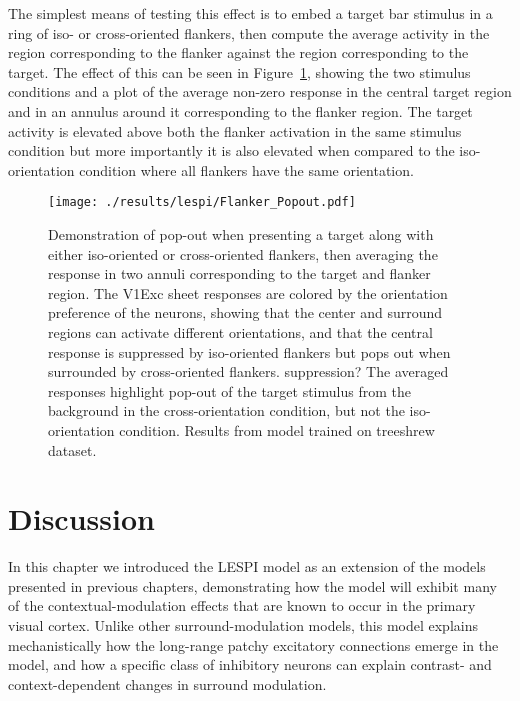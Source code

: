 The simplest means of testing this effect is to embed a target bar
stimulus in a ring of iso- or cross-oriented flankers, then compute
the average activity in the region corresponding to the flanker
against the region corresponding to the target. The
effect of this can be seen in Figure~\ref{Flanker_PopOut}, showing the
two stimulus conditions and a plot of the average non-zero response in
the central target region and in an annulus around it corresponding to
the flanker region. The target activity is elevated above both the
flanker activation in the same stimulus condition but more importantly
it is also elevated when compared to the iso-orientation condition
where all flankers have the same orientation.

\begin{figure}
	\centering
        \texttt{[image: ./results/lespi/Flanker\_Popout.pdf]}
	\caption[Pop-out effect in simple flanker paradigm.]{Demonstration
      of pop-out when presenting a target along with either
      iso-oriented or cross-oriented flankers, then averaging the
      response in two annuli corresponding to the target and flanker
      region. The V1Exc sheet responses are colored by the
      orientation preference of the neurons, showing that the center
      and surround regions can activate different orientations, and
      that the central response is suppressed by iso-oriented flankers
      but pops out when surrounded by cross-oriented flankers.
      suppression?  The averaged responses highlight pop-out of the
      target stimulus from the background in the cross-orientation
      condition, but not the iso-orientation condition. Results from
      model trained on treeshrew dataset.}
	\label{Flanker_PopOut}
\end{figure}

\section{Discussion}

In this chapter we introduced the LESPI model as an extension of the
models presented in previous chapters, demonstrating how the model
will exhibit many of the contextual-modulation effects that are known
to occur in the primary visual cortex. Unlike other
surround-modulation models, this model explains mechanistically how the
long-range patchy excitatory connections emerge in the model, and how a
specific class of inhibitory neurons can explain contrast- and
context-dependent changes in surround modulation.

